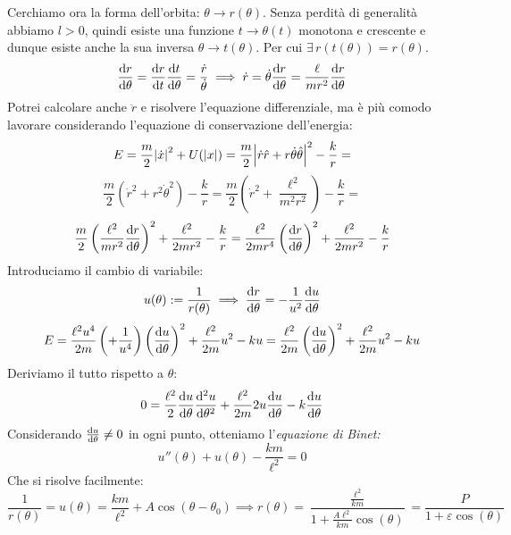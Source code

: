 Cerchiamo ora la forma dell'orbita: $\theta\rightarrow r(\theta)$. Senza perdità di generalità abbiamo $l>0$, 
quindi esiste una funzione $t\rightarrow\theta(t)$ monotona e crescente e dunque esiste anche la sua inversa $\theta\rightarrow t(\theta)$.
Per cui $\exists \,r(t(\theta))= r(\theta)$. 
\begin{equation}
    \dv{r}{\theta}=\dv{r}{t}\dv{t}{\theta}= \frac{\dot{r}}{\dot{\theta}}\implies \dot{r}= \dot{\theta}\dv{r}{\theta}= \frac{\ell}{mr^2}\dv{r}{\theta}
\end{equation}
Potrei calcolare anche $\ddot{r}$ e risolvere l'equazione differenziale, ma è più comodo lavorare considerando l'equazione di conservazione dell'energia:
\begin{equation*}
    E= \frac{m}{2}\abs{\dot{x}}^2 + U(\abs{x})= \frac{m}{2}\abs{\dot{r}\hat{r}+ r\dot{\theta}\hat{\theta}}^2-\frac{k}{r}=
\end{equation*}
\begin{equation*}
    \frac{m}{2}\left( \dot{r}^2 + r^2\dot{\theta}^2  \right)-\frac{k}{r}= \frac{m}{2}\left( \dot{r}^2 + \frac{\ell^2}{m^2r^2}\right)-\frac{k}{r}=
\end{equation*}
\begin{equation*}
    \frac{m}{2}\left( \frac{\ell^2}{mr^2}\dv{r}{\theta} \right)^2+ \frac{\ell^2}{2mr^2}-\frac{k}{r}= 
    \frac{\ell^2}{2mr^4}\left( \dv{r}{\theta} \right)^2+\frac{\ell^2}{2mr^2}-\frac{k}{r}
\end{equation*}
Introduciamo il cambio di variabile:
\begin{equation}
    u(\theta):= \frac{1}{r(\theta)}\implies \dv{r}{\theta}= -\frac{1}{u^2}\dv{u}{\theta}
\end{equation}
\begin{equation}
    E=\frac{\ell^2u^4}{2m}\left( +\frac{1}{u^4} \right)\left( \dv{u}{\theta} \right)^2+\frac{\ell^2}{2m}u^2-ku=
    \frac{\ell^2}{2m}\left( \dv{u}{\theta} \right)^2+\frac{\ell^2}{2m}u^2-ku
\end{equation}
Deriviamo il tutto rispetto a $\theta$:
\begin{equation}
    0 = \frac{\ell^2} 2\dv{u}{\theta}\dv[2]{u}{\theta}+\frac{\ell^2}{2m}2u\dv{u}{\theta} -k\dv{u}{\theta}
\end{equation}
Considerando $\dv{u}{\theta}\neq 0$ in ogni punto, otteniamo l'\textit{equazione di Binet:}
\begin{equation}
    u''(\theta)+u(\theta)- \frac{km}{\ell^2}=0
\end{equation}
Che si risolve facilmente:
\begin{equation}
    \frac{1}{r(\theta)}=u(\theta)= \frac{km}{\ell^2}+A\cos(\theta-\theta_0)\implies r(\theta)= 
    \frac{\frac{\ell^2}{km}}{1+\frac{A\ell^2}{km}\cos(\theta)}= \frac{P}{1+\varepsilon\cos(\theta)}
\end{equation}






